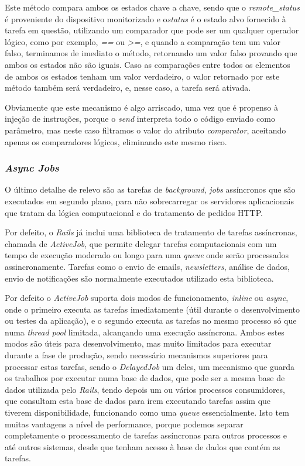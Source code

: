 Este método compara ambos os estados chave a chave, sendo que o \textit{remote\_status} é proveniente do dispositivo monitorizado e o\textit{status} é o estado alvo fornecido à tarefa em questão, utilizando um comparador que pode ser um qualquer operador lógico, como por exemplo, \textit{==} ou \textit{>=}, e quando a comparação tem um valor falso, terminamos de imediato o método, retornando um valor falso provando que ambos os estados não são iguais. Caso as comparações entre todos os elementos de ambos os estados tenham um valor verdadeiro, o valor retornado por este método também será verdadeiro, e, nesse caso, a tarefa será ativada.

Obviamente que este mecanismo é algo arriscado, uma vez que é propenso à injeção de instruções, porque o \textit{send} interpreta todo o código enviado como parâmetro, mas neste caso filtramos o valor do atributo \textit{comparator}, aceitando apenas os comparadores lógicos, eliminando este mesmo risco.

\subsubsection{\textit{Async Jobs}}

O último detalhe de relevo são as tarefas de \textit{background}, \textit{jobs} assíncronos que são executados em segundo plano, para não sobrecarregar os servidores aplicacionais que tratam da lógica computacional e do tratamento de pedidos HTTP.

Por defeito, o \textit{Rails} já inclui uma biblioteca de tratamento de tarefas assíncronas, chamada de \textit{ActiveJob}, que permite delegar tarefas computacionais com um tempo de execução moderado ou longo para uma \textit{queue} onde serão processados assincronamente. Tarefas como o envio de emails, \textit{newsletters}, análise de dados, envio de notificações são normalmente executados utilizado esta biblioteca. 

Por defeito o \textit{ActiveJob} suporta dois modos de funcionamento, \textit{inline} ou \textit{async}, onde o primeiro executa as tarefas imediatamente (útil durante o desenvolvimento ou testes da aplicação), e o segundo executa as tarefas no mesmo processo só que numa \textit{thread pool} limitada, alcançando uma execução assíncrona. Ambos estes modos são úteis para desenvolvimento, mas muito limitados para executar durante a fase de produção, sendo necessário mecanismos superiores para processar estas tarefas, sendo o \textit{DelayedJob} um deles, um mecanismo que guarda os trabalhos por executar numa base de dados, que pode ser a mesma base de dados utilizada pelo \textit{Rails}, tendo depois um ou vários processos consumidores, que consultam esta base de dados para irem executando tarefas assim que tiverem disponibilidade, funcionando como uma \textit{queue} essencialmente. Isto tem muitas vantagens a nível de performance, porque podemos separar completamente o processamento de tarefas assíncronas para outros processos e até outros sistemas, desde que tenham acesso à base de dados que contém as tarefas.

